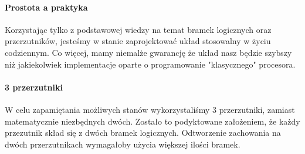\documentclass{article}
\begin{document}
\paragraph{Prostota a praktyka}
Korzystając tylko z podstawowej wiedzy na temat bramek logicznych oraz przerzutników, jesteśmy w stanie zaprojektować układ stosowalny w życiu codziennym. Co więcej, mamy niemalże gwarancję że układ nasz będzie szybszy niż jakiekolwiek implementacje oparte o programowanie "klasycznego" procesora.
\paragraph{3 przerzutniki}
W celu zapamiętania możliwych stanów wykorzystaliśmy 3 przerzutniki, zamiast matematycznie niezbędnych dwóch.
Zostało to podyktowane założeniem, że każdy przezutnik skład się z dwóch bramek logicznych. Odtworzenie zachowania na dwóch przerzutnikach wymagałoby użycia większej ilości bramek.
\end{document}
